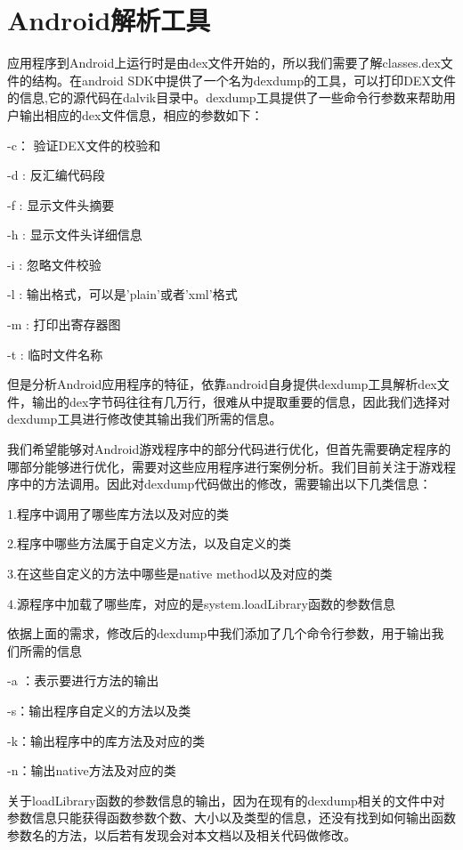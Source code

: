 \section{Android解析工具}
应用程序到Android上运行时是由dex文件开始的，所以我们需要了解classes.dex文件的结构。在android SDK中提供了一个名为dexdump的工具，可以打印DEX文件的信息,它的源代码在dalvik目录中。dexdump工具提供了一些命令行参数来帮助用户输出相应的dex文件信息，相应的参数如下：

-c： 验证DEX文件的校验和

-d :  反汇编代码段

-f : 显示文件头摘要

-h : 显示文件头详细信息

-i : 忽略文件校验

-l : 输出格式，可以是'plain'或者'xml'格式

-m :  打印出寄存器图

-t : 临时文件名称

但是分析Android应用程序的特征，依靠android自身提供dexdump工具解析dex文件，输出的dex字节码往往有几万行，很难从中提取重要的信息，因此我们选择对dexdump工具进行修改使其输出我们所需的信息。

我们希望能够对Android游戏程序中的部分代码进行优化，但首先需要确定程序的哪部分能够进行优化，需要对这些应用程序进行案例分析。我们目前关注于游戏程序中的方法调用。因此对dexdump代码做出的修改，需要输出以下几类信息：

1.程序中调用了哪些库方法以及对应的类

2.程序中哪些方法属于自定义方法，以及自定义的类

3.在这些自定义的方法中哪些是native method以及对应的类

4.源程序中加载了哪些库，对应的是system.loadLibrary函数的参数信息

依据上面的需求，修改后的dexdump中我们添加了几个命令行参数，用于输出我们所需的信息

-a ：表示要进行方法的输出

-s：输出程序自定义的方法以及类

-k：输出程序中的库方法及对应的类

-n：输出native方法及对应的类

关于loadLibrary函数的参数信息的输出，因为在现有的dexdump相关的文件中对参数信息只能获得函数参数个数、大小以及类型的信息，还没有找到如何输出函数参数名的方法，以后若有发现会对本文档以及相关代码做修改。






